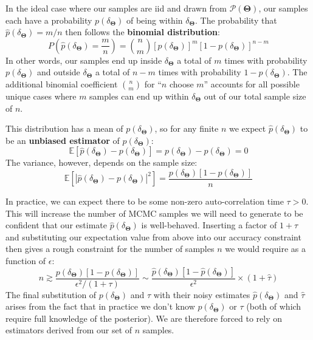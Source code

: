 \documentclass[12pt, titlepage]{article}
\newcommand{\mean}[1]{\ensuremath{\mathbb{E}\left[{#1}\right]}}
\newcommand{\params}{\ensuremath{\boldsymbol\Theta}}
\newcommand{\posterior}{\ensuremath{\mathcal{P}}}
\begin{document}
In the ideal case where our samples are iid and drawn from $\posterior(\params)$,
our samples each have a probability $p(\delta_{\params})$ 
of being within $\delta_{\params}$.
The probability that $\hat{p}(\delta_{\params}) = m/n$ then follows the
\textbf{binomial distribution}:
\begin{equation}
    P\left(\hat{p}(\delta_{\params}) = \frac{m}{n} \right) 
    = \binom{n}{m} \left[p(\delta_{\params})\right]^m
    \left[1 - p(\delta_{\params}) \right]^{n-m}
\end{equation}
In other words, our samples end up inside $\delta_{\params}$ a total of $m$ times
with probability $p(\delta_{\params})$ and outside $\delta_{\params}$ a
total of $n-m$ times with probability $1 - p(\delta_{\params})$. The
additional binomial coefficient $\binom{n}{m}$ for ``$n$ choose $m$'' 
accounts for all possible unique cases where $m$ samples can
end up within $\delta_{\params}$ out of our total sample size of $n$.

This distribution has a mean of $p(\delta_{\params})$, so for
any finite $n$ we expect $\hat{p}(\delta_{\params})$ to be an
\textbf{unbiased estimator} of $p(\delta_{\params})$:
\begin{equation}
    \mean{\hat{p}(\delta_{\params}) - p(\delta_{\params})} 
    = p(\delta_{\params}) - p(\delta_{\params}) = 0
\end{equation}
The variance, however, depends on the sample size:
\begin{equation}
    \mean{|\hat{p}(\delta_{\params}) - p(\delta_{\params})|^2}
    = \frac{p(\delta_{\params}) \left[1 - p(\delta_{\params})\right]}{n}
\end{equation}

In practice, we can expect there to be some non-zero auto-correlation
time $\tau > 0$. This will increase the number of MCMC samples
we will need to generate to be confident that our estimate
$\hat{p}(\delta_{\params})$ is well-behaved. Inserting a factor
of $1+\tau$ and substituting our expectation value from above
into our accuracy constraint then gives a
rough constraint for the number of samples $n$ we would require
as a function of $\epsilon$:
\begin{equation}
    n \gtrsim 
    \frac{p(\delta_{\params}) \left[1 - p(\delta_{\params})\right]}
    {\epsilon^2/(1+\tau)} 
    \sim \frac{\hat{p}(\delta_{\params}) 
    \left[1 - \hat{p}(\delta_{\params})\right]}
    {\epsilon^2} \times (1+\hat{\tau})
\end{equation}
The final substitution of $p(\delta_{\params})$ and $\tau$ with their
noisy estimates $\hat{p}(\delta_{\params})$ and $\hat{\tau}$
arises from the fact that
in practice we don't know $p(\delta_{\params})$ or 
$\tau$ (both of which require full knowledge of the posterior).
We are therefore forced to rely on estimators
derived from our set of $n$ samples.
\end{document}

